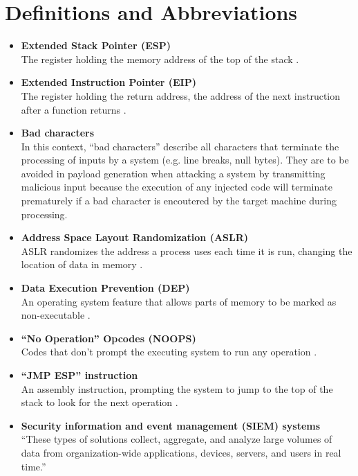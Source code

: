 \documentclass[../report.tex]{subfiles}
\begin{document}
\section{Definitions and Abbreviations}

\begin{itemize}
	\item{\textbf{Extended Stack Pointer (ESP)}}\\
	The register holding the memory address of the top of the stack \autocite{intel:dev_manual}.
	\item{\textbf{Extended Instruction Pointer (EIP)}}\\
	The register holding the return address, the address of the next instruction after a function returns \autocite{intel:dev_manual}.
	\item{\textbf{Bad characters}}\\
	In this context, \enquote{bad characters} describe all characters that terminate the processing of inputs by a system (e.g. line breaks, null bytes). They are to be avoided in payload generation when attacking a system by transmitting malicious input because the execution of any injected code will terminate prematurely if a bad character is encoutered by the target machine during processing.
	\item{\textbf{Address Space Layout Randomization (ASLR)}}\\
	ASLR randomizes the address a process uses each time it is run, changing the location of data in memory \autocite{app9142928}.
	\item{\textbf{Data Execution Prevention (DEP)}}\\
	An operating system feature that allows parts of memory to be marked as non-executable \autocite{microsoft:dep}.
	\item{\textbf{\enquote{No Operation} Opcodes (NOOPS)}}\\
	Codes that don't prompt the executing system to run any operation \autocite{arm_developer:nop}.
	\item{\textbf{\enquote{JMP ESP} instruction}}\\
	An assembly instruction, prompting the system to jump to the top of the stack to look for the next operation \autocite{arm_developer:jmp}.
	\item{\textbf{Security information and event management (SIEM) systems}}\\
	\enquote{These types of solutions collect, aggregate, and analyze large volumes of data from organization-wide applications, devices, servers, and users in real time.} \autocite{microsoft:siem}

\end{itemize}
\end{document}
